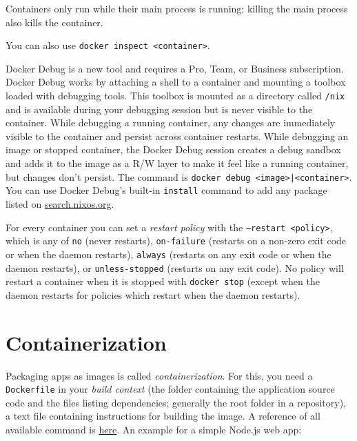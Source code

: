 \documentclass[table, xcdraw]{article}%
\begin{document}
Containers only run while their main process is running; killing the main process also kills the container.

You can also use \texttt{docker inspect <container>}.

Docker Debug is a new tool and requires a Pro, Team, or Business subscription. Docker Debug works by attaching a shell to a container and mounting a toolbox loaded with debugging tools. This toolbox is mounted as a directory called \texttt{/nix} and is available during your debugging session but is never visible to the container. While debugging a running container, any changes are immediately visible to the container and persist across container restarts. While debugging an image or stopped container, the Docker Debug session creates a debug sandbox and adds it to the image as a R/W layer to make it feel like a running container, but changes don't persist. The command is \texttt{docker debug <image>|<container>}. You can use Docker Debug’s built-in \texttt{install} command to add any package listed on \url{search.nixos.org}.

For every container you can set a \emph{restart policy} with the \texttt{--restart <policy>}, which is any of \texttt{no} (never restarts), \texttt{on-failure} (restarts on a non-zero exit code or when the daemon restarts), \texttt{always} (restarts on any exit code or when the daemon restarts), or \texttt{unless-stopped} (restarts on any exit code). No policy will restart a container when it is stopped with \texttt{docker stop} (except when the daemon restarts for policies which restart when the daemon restarts).

\section{Containerization}

Packaging apps as images is called \emph{containerization}. For this, you need a \texttt{Dockerfile} in your \emph{build context} (the folder containing the application source code and the files listing dependencies; generally the root folder in a repository), a text file containing instructions for building the image.  A reference of all available command is \href{https://docs.docker.com/reference/dockerfile/}{here}. An example for a simple Node.js web app:
\end{document}
